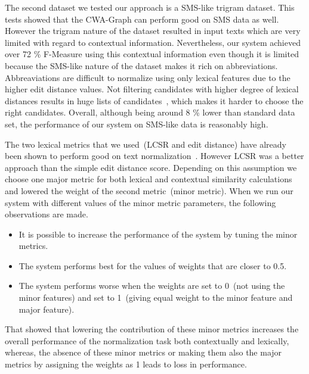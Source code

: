 \documentclass[a4paper,onesided,12pt]{report}
\begin{document}
The second dataset we tested our approach is a SMS-like trigram dataset. This tests showed that the CWA-Graph can perform good on SMS data as well. However the trigram nature of the dataset resulted in input texts which are very limited with regard to contextual information. Nevertheless, our system achieved over 72 \% F-Measure using this contextual information even though it is limited because the SMS-like nature of the dataset makes it rich on abbreviations. Abbreaviations are difficult to normalize using only lexical features due to the higher edit distance values. Not filtering candidates with higher degree of lexical distances results in huge lists of candidates~\cite{Han:2011:LNS:2002472.2002520}, which makes it harder to choose the right candidates. Overall, although being around 8 \% lower than standard data set, the performance of our system on SMS-like data is reasonably high.


The two lexical metrics that we used~(LCSR and edit distance) have already been shown to perform good on text normalization~\cite{Han:2011:LNS:2002472.2002520,DBLP:conf/acl/HassanM13}. However LCSR was a better approach than the simple edit distance score. Depending on this assumption we choose one major metric for both lexical and contextual similarity calculations and lowered the weight of the second metric~(minor metric). When we run our system with different values of the minor metric parameters, the following observations are made.
\begin{itemize}
\item It is possible to increase the performance of the system by tuning the minor metrics.
\item The system performs best for the values of weights that are closer to 0.5.
\item The system performs worse when the weights are set to 0~(not using the minor features) and set to 1~(giving equal weight to the minor feature and major feature).
\end{itemize}

That showed that lowering the contribution of these minor metrics increases the overall performance of the normalization task both contextually and lexically, whereas, the absence of these minor metrics or making them also the major metrics by assigning the weights as 1 leads to loss in performance.
\end{document}
